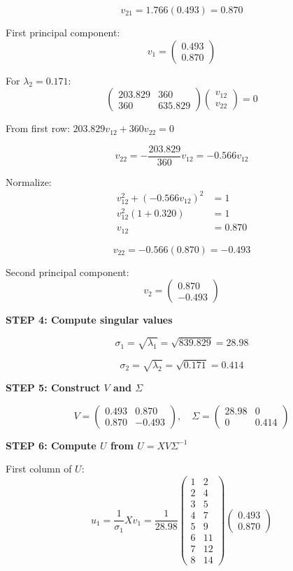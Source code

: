 \documentclass[12pt]{article}
\begin{document}
\begin{solution}
\[
v_{21} = 1.766(0.493) = 0.870
\]

First principal component:
\[
v_1 = \begin{pmatrix}
0.493 \\
0.870
\end{pmatrix}
\]

For $\lambda_2 = 0.171$:
\[
\begin{pmatrix}
203.829 & 360 \\
360 & 635.829
\end{pmatrix}
\begin{pmatrix}
v_{12} \\
v_{22}
\end{pmatrix} = 0
\]

From first row: $203.829 v_{12} + 360 v_{22} = 0$

\[
v_{22} = -\frac{203.829}{360} v_{12} = -0.566 v_{12}
\]

Normalize:
\begin{align*}
v_{12}^2 + (-0.566 v_{12})^2 &= 1 \\
v_{12}^2(1 + 0.320) &= 1 \\
v_{12} &= 0.870
\end{align*}

\[
v_{22} = -0.566(0.870) = -0.493
\]

Second principal component:
\[
v_2 = \begin{pmatrix}
0.870 \\
-0.493
\end{pmatrix}
\]

\textbf{STEP 4: Compute singular values}

\[
\sigma_1 = \sqrt{\lambda_1} = \sqrt{839.829} = 28.98
\]

\[
\sigma_2 = \sqrt{\lambda_2} = \sqrt{0.171} = 0.414
\]

\textbf{STEP 5: Construct $V$ and $\Sigma$}

\[
V = \begin{pmatrix}
0.493 & 0.870 \\
0.870 & -0.493
\end{pmatrix}, \quad
\Sigma = \begin{pmatrix}
28.98 & 0 \\
0 & 0.414
\end{pmatrix}
\]

\textbf{STEP 6: Compute $U$ from $U = XV\Sigma^{-1}$}

First column of $U$:
\[
u_1 = \frac{1}{\sigma_1} Xv_1 = \frac{1}{28.98} \begin{pmatrix}
1 & 2 \\
2 & 4 \\
3 & 5 \\
4 & 7 \\
5 & 9 \\
6 & 11 \\
7 & 12 \\
8 & 14
\end{pmatrix}
\begin{pmatrix}
0.493 \\
0.870
\end{pmatrix}
\]


\end{solution}
\end{document}
